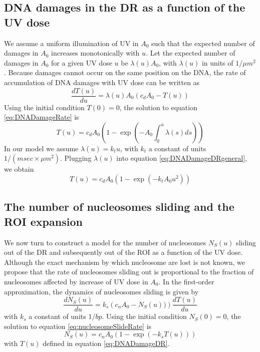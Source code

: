 \documentclass[12pt]{article}
\begin{document}
	\subsection{DNA damages in the DR as a function of the UV dose}\label{subsection:AccumulationOfDNADamagesInTheDR}
	 We assume a uniform illumination of UV in $A_0$ such that the expected number of damages in $A_0$ increases monotonically with $u$. Let the expected number of damages in $A_0$ for a given UV dose $u$ be $\lambda(u)A_0$, with $\lambda(u)$ in units of $1/\mu m^2$. Because damages cannot occur on the same position on the DNA, the rate of accumulation of DNA damages with UV dose can be written as
	\begin{equation}\label{eq:DNADamageRate}
	\frac{dT(u)}{du} = \lambda(u)A_0(c_dA_0 - T(u))
	\end{equation}	
	 Using the initial condition $T(0) = 0$, the solution to equation \eqref{eq:DNADamageRate} is
	\begin{equation}\label{eq:DNADamageDRgeneral}
	T(u) = c_dA_0(1-\exp(-A_0\int_0^u\lambda(s)ds))
	\end{equation}
	In our model we assume $\lambda(u)=k_tu$, with $k_t$ a constant of units  $1/(msec\times \mu m^2)$. Plugging $\lambda(u)$ into equation \eqref{eq:DNADamageDRgeneral}, we obtain 
	\begin{equation}\label{eq:DNADamageDR}
	T(u) = c_dA_0(1-\exp(-k_tA_0u^2))
	\end{equation}
	
	\subsection{The number of nucleosomes sliding and the ROI expansion}
	We now turn to construct a model for the number of nucleosomes $N_S(u)$
	sliding out of the DR and subsequently out of the ROI as a function of the UV dose. Although the exact mechanism by which nucleosome are lost is not known, 
	we propose that the rate of nucleosomes sliding out is proportional to the fraction of nucleosomes affected by increase of UV dose in $A_0$. In the first-order approximation, the dynamics of nucleosomes sliding is given by
	\begin{equation}\label{eq:nucleosomeSlideRate}
	\frac{dN_S(u)}{du} = k_s\left(c_nA_0-N_S(u))\right)\frac{dT(u)}{du}	 
	\end{equation}
	with $k_s$ a constant of units $1/bp$. Using the initial condition $N_S(0)=0$, the solution to equation \eqref{eq:nucleosomeSlideRate} is 
	\begin{equation}\label{eq:nucleosomeSlideDR}
	N_S(u)= c_nA_0\left(1-\exp(-k_sT(u))\right)
	\end{equation}
	with $T(u)$ defined in equation \eqref{eq:DNADamageDR}.
\end{document}
